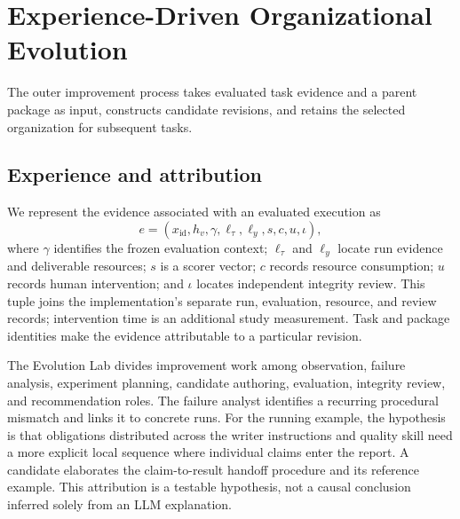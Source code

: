 \section{Experience-Driven Organizational Evolution}\label{sec:evolution}
The outer improvement process takes evaluated task evidence and a parent package as input, constructs candidate revisions, and retains the selected organization for subsequent tasks.

\subsection{Experience and attribution}
We represent the evidence associated with an evaluated execution as
\begin{equation}
e=(x_{\mathrm{id}},h_v,\gamma,\ell_{\tau},\ell_y,s,c,u,\iota),
\label{eq:experience}
\end{equation}
where $\gamma$ identifies the frozen evaluation context; $\ell_{\tau}$ and $\ell_y$ locate run evidence and deliverable resources; $s$ is a scorer vector; $c$ records resource consumption; $u$ records human intervention; and $\iota$ locates independent integrity review. This tuple joins the implementation's separate run, evaluation, resource, and review records; intervention time is an additional study measurement. Task and package identities make the evidence attributable to a particular revision.

The Evolution Lab divides improvement work among observation, failure analysis, experiment planning, candidate authoring, evaluation, integrity review, and recommendation roles. The failure analyst identifies a recurring procedural mismatch and links it to concrete runs. For the running example, the hypothesis is that obligations distributed across the writer instructions and quality skill need a more explicit local sequence where individual claims enter the report. A candidate elaborates the claim-to-result handoff procedure and its reference example. This attribution is a testable hypothesis, not a causal conclusion inferred solely from an LLM explanation.


